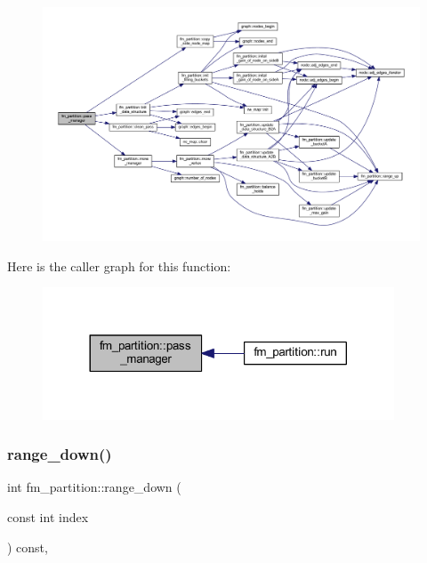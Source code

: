 \begin{figure}[H]
\begin{center}
\leavevmode
\includegraphics[width=350pt]{classfm__partition_aec7b2a315bc003fbd98debd5cd879f99_cgraph}
\end{center}
\end{figure}
Here is the caller graph for this function\+:\nopagebreak
\begin{figure}[H]
\begin{center}
\leavevmode
\includegraphics[width=296pt]{classfm__partition_aec7b2a315bc003fbd98debd5cd879f99_icgraph}
\end{center}
\end{figure}
\mbox{\label{classfm__partition_ab0bfbda97056ac75ab5fbfa6fd20fd03}} 
\subsubsection{\texorpdfstring{range\+\_\+down()}{range\_down()}}
{\footnotesize\ttfamily int fm\+\_\+partition\+::range\+\_\+down (\begin{DoxyParamCaption}\item[{const int}]{index }\end{DoxyParamCaption}) const\hspace{0.3cm}{\ttfamily [inline]}, {\ttfamily [protected]}}



